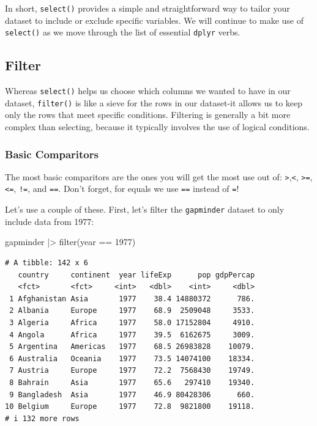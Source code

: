 \documentclass[
  letterpaper,
]{book}
\newenvironment{Shaded}{\begin{snugshade}}{\end{snugshade}}
\newcommand{\DecValTok}[1]{\textcolor[rgb]{0.68,0.00,0.00}{#1}}
\newcommand{\FunctionTok}[1]{\textcolor[rgb]{0.28,0.35,0.67}{#1}}
\newcommand{\NormalTok}[1]{\textcolor[rgb]{0.00,0.23,0.31}{#1}}
\newcommand{\SpecialCharTok}[1]{\textcolor[rgb]{0.37,0.37,0.37}{#1}}
\begin{document}
In short, \texttt{select()} provides a simple and straightforward way to
tailor your dataset to include or exclude specific variables. We will
continue to make use of \texttt{select()} as we move through the list of
essential \texttt{dplyr} verbs.

\subsection{Filter}\label{filter}

Whereas \texttt{select()} helps us choose which columns we wanted to
have in our dataset, \texttt{filter()} is like a sieve for the rows in
our dataset-it allows us to keep only the rows that meet specific
conditions. Filtering is generally a bit more complex than selecting,
because it typically involves the use of logical conditions.

\subsubsection{Basic Comparitors}\label{basic-comparitors}

The most basic comparitors are the ones you will get the most use out
of: \texttt{\textgreater{}},\texttt{\textless{}},
\texttt{\textgreater{}=},\texttt{\textless{}=}, \texttt{!=}, and
\texttt{==}. Don't forget, for equals we use \texttt{==} instead of
\texttt{=}!

Let's use a couple of these. First, let's filter the \texttt{gapminder}
dataset to only include data from 1977:

\begin{Shaded}
\begin{Highlighting}[]
\NormalTok{gapminder }\SpecialCharTok{|\textgreater{}} 
  \FunctionTok{filter}\NormalTok{(year }\SpecialCharTok{==} \DecValTok{1977}\NormalTok{) }
\end{Highlighting}
\end{Shaded}

\begin{verbatim}
# A tibble: 142 x 6
   country     continent  year lifeExp      pop gdpPercap
   <fct>       <fct>     <int>   <dbl>    <int>     <dbl>
 1 Afghanistan Asia       1977    38.4 14880372      786.
 2 Albania     Europe     1977    68.9  2509048     3533.
 3 Algeria     Africa     1977    58.0 17152804     4910.
 4 Angola      Africa     1977    39.5  6162675     3009.
 5 Argentina   Americas   1977    68.5 26983828    10079.
 6 Australia   Oceania    1977    73.5 14074100    18334.
 7 Austria     Europe     1977    72.2  7568430    19749.
 8 Bahrain     Asia       1977    65.6   297410    19340.
 9 Bangladesh  Asia       1977    46.9 80428306      660.
10 Belgium     Europe     1977    72.8  9821800    19118.
# i 132 more rows
\end{verbatim}
\end{document}
